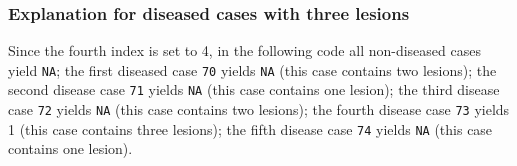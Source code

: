 \documentclass[
]{book}
\newenvironment{Shaded}{\begin{snugshade}}{\end{snugshade}}
\newcommand{\CommentTok}[1]{\textcolor[rgb]{0.56,0.35,0.01}{\textit{#1}}}
\newcommand{\DecValTok}[1]{\textcolor[rgb]{0.00,0.00,0.81}{#1}}
\newcommand{\FunctionTok}[1]{\textcolor[rgb]{0.00,0.00,0.00}{#1}}
\newcommand{\NormalTok}[1]{#1}
\newcommand{\SpecialCharTok}[1]{\textcolor[rgb]{0.00,0.00,0.00}{#1}}
\begin{document}
\hypertarget{explanation-for-diseased-cases-with-three-lesions}{%
\subsubsection{Explanation for diseased cases with three lesions}\label{explanation-for-diseased-cases-with-three-lesions}}

Since the fourth index is set to 4, in the following code all non-diseased cases yield \texttt{NA}; the first diseased case \texttt{70} yields \texttt{NA} (this case contains two lesions); the second disease case \texttt{71} yields \texttt{NA} (this case contains one lesion); the third disease case \texttt{72} yields \texttt{NA} (this case contains two lesions); the fourth disease case \texttt{73} yields 1 (this case contains three lesions); the fifth disease case \texttt{74} yields \texttt{NA} (this case contains one lesion).

\begin{Shaded}
\end{Shaded}
\end{document}
